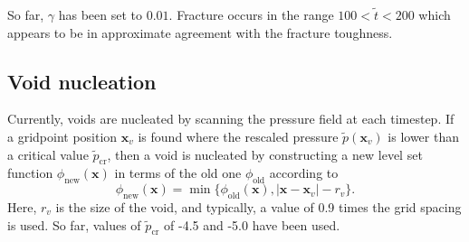 \documentclass[12pt]{article}
\renewcommand{\vec}[1]{\mathbf{#1}}
\begin{document}
So far, $\gamma$ has been set to $0.01$. Fracture occurs in the range $100<\tilde{t}<200$ which appears to be in approximate agreement with the fracture toughness.

\subsection*{Void nucleation}
Currently, voids are nucleated by scanning the pressure field at each timestep.
If a gridpoint position $\vec{x}_v$ is found where the rescaled pressure
$\tilde{p}(\vec{x}_v)$ is lower than a critical value $\tilde{p}_\textrm{cr}$,
then a void is nucleated by constructing a new level set function
$\phi_\textrm{new}(\vec{x})$ in terms of the old one $\phi_\textrm{old}$
according to
\[
\phi_\textrm{new}(\vec{x}) = \min\{ \phi_\textrm{old}(\vec{x}), |\vec{x}-\vec{x}_v|-r_v\}.
\]
Here, $r_v$ is the size of the void, and typically, a value of 0.9 times the
grid spacing is used. So far, values of $\tilde{p}_\textrm{cr}$ of -4.5 and -5.0
have been used.
\end{document}
